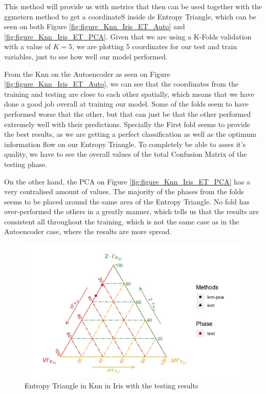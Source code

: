 \documentclass[12pt]{report}
\begin{document}
This method will provide us with metrics that then can be used together with the ggmetern method to get a coordinateS inside de Entropy Triangle, which can be seen on both Figure \ref{fig:figure_Knn_Iris_ET_Auto} and \ref{fig:figure_Knn_Iris_ET_PCA}. Given that we are using a K-Folds validation with a value of $K = 5$, we are plotting 5 coordinates for our test and train variables, just to see how well our model performed.\newline

From the Knn on the Autoencoder as seen on Figure \ref{fig:figure_Knn_Iris_ET_Auto}, we can see that the coordinates from the training and testing are close to each other spatially, which means that we have done a good job overall at training our model. Some of the folds seem to have performed worse that the other, but that can just be that the other performed extremely well with their predictions. Specially the First fold seems to provide the best results, as we are getting a perfect classification as well as the optimum information flow on our Entropy Triangle. To completely be able to asses it's quality, we have to see the overall values of the total Confusion Matrix of the testing phase.\par

On the other hand, the PCA on Figure \ref{fig:figure_Knn_Iris_ET_PCA} has a very centralised amount of values. The majority of the phases from the folds seems to be placed around the same area of the Entropy Triangle. No fold has over-performed the others in a greatly manner, which tells us that the results are consistent all throughout the training, which is not the same case as in the Autoencoder case, where the results are more spread. \par

\begin{figure}[H]
	\centering
	\includegraphics[width=1.2\linewidth]{Figuras_tfg/Total_ET_Knn_Iris}
	\caption{Entropy Triangle in Knn in Iris with the testing results}
	\label{fig:figure_Knn_Iris_ET_PCA_Auto}
\end{figure}
\end{document}

